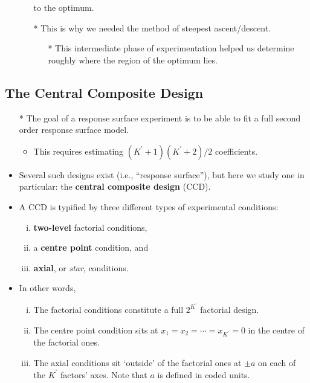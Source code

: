 \begin{itemize}
\begin{itemize}
                  to the optimum.
            \item[*] This is why we needed the method of steepest ascent/descent.
                \begin{itemize}
                    \item[*] This intermediate phase of experimentation helped us determine roughly where the region of
                        the optimum lies.
                \end{itemize}
        \end{itemize}
\end{itemize}
\subsection{The Central Composite Design}
\begin{itemize}
    \item[*] The goal of a response surface experiment is to be able to fit a full second order response surface model.
        \begin{itemize}
            \item This requires estimating $ (K^\prime+1)(K^\prime+2)/2 $ coefficients.
        \end{itemize}
    \item Several such designs exist (i.e., ``response surface''), but here we study one in particular: the \textbf{central composite design} (CCD).
    \item A CCD is typified by three different types of experimental conditions:
          \begin{enumerate}[i.]
              \item \textbf{two-level} factorial conditions,
              \item a \textbf{centre point} condition, and
              \item \textbf{axial}, or \emph{star}, conditions.
          \end{enumerate}
    \item In other words,
          \begin{enumerate}[i.]
              \item The factorial conditions constitute a full $ 2^{K^\prime} $ factorial design.
              \item The centre point condition sits at $ x_1=x_2=\cdots=x_{K^\prime}=0 $ in the centre of the factorial ones.
              \item The axial conditions sit `outside' of the factorial ones at $ \pm a $ on each of the $ K^\prime $ factors' axes. Note that $ a $ is defined in coded units.

\end{enumerate}
\end{itemize}
